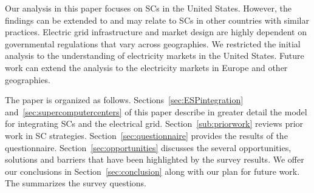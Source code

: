 Our analysis in this paper focuses %
on SCs in the United States. However, 
the findings can be extended to and may relate to SCs in other countries with similar practices. 
Electric grid infrastructure and market design are highly dependent on %
governmental regulations that vary across geographies.  We restricted the initial analysis to the understanding of 
electricity markets in the United States. Future work can extend the analysis to the electricity markets in Europe and other geographies.

The paper is organized as follows.
Sections~\ref{sec:ESPintegration} and~\ref{sec:supercomputercenters} of this paper
describe in greater detail the model for 
integrating SCs and the electrical grid.
Section~\ref{sub:priorwork}
reviews prior work in SC strategies. %
Section~\ref{sec:questionnaire} provides the results of the questionnaire. 
Section~\ref{sec:opportunities} 
discusses the several opportunities, solutions and barriers that have been highlighted
by the survey results. We offer our conclusions in Section~\ref{sec:conclusion} along with our plan for future work.  
The  summarizes the survey questions.
